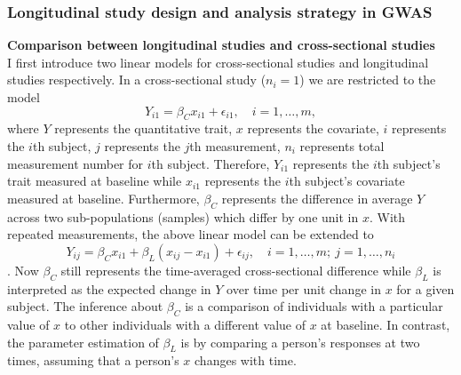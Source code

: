 \documentclass[12pt]{article}
\begin{document}
\subsubsection{Longitudinal study design and analysis strategy in GWAS}\label{sec:bg:longi}
\textbf{Comparison between longitudinal studies and cross-sectional studies}\\
I first introduce two linear models for cross-sectional studies and longitudinal studies respectively. In a cross-sectional study ($n_i = 1$) we are restricted to the model
\begin{equation}
Y_{i1} = \beta_C x_{i1} + \epsilon_{i1}, \quad i = 1,\ldots,m,
\label{eq:crosssec}
\end{equation}
where $Y$ represents the quantitative trait, $x$ represents the covariate, $i$ represents the $i$th subject, $j$ represents the $j$th measurement, $n_i$ represents total measurement number for $i$th subject. Therefore, $Y_{i1}$ represents the $i$th subject's trait measured at baseline while $x_{i1}$ represents the $i$th subject's covariate measured at baseline. Furthermore, $\beta_C$ represents the difference in average $Y$ across two sub-populations (samples) which differ by one unit in $x$. With repeated measurements, the above linear model can be extended to
\begin{equation}
Y_{ij} = \beta_C x_{i1} + \beta_L ( x_{ij} - x_{i1} ) + \epsilon_{ij}, \quad i = 1, \ldots, m; \ j = 1, \ldots, n_i 
\label{eq:longitudinal}
\end{equation}
\cite{WARE1990}. Now $\beta_C$ still represents the time-averaged cross-sectional difference while $\beta_L$ is interpreted as the expected change in $Y$ over time per unit change in $x$ for a given subject. The inference about $\beta_C$ is a comparison of individuals with a particular value of $x$ to other individuals with a different value of $x$ at baseline. In contrast, the parameter estimation of $\beta_L$ is by comparing a person's responses at two times, assuming that a person's $x$ changes with time.
\end{document}
